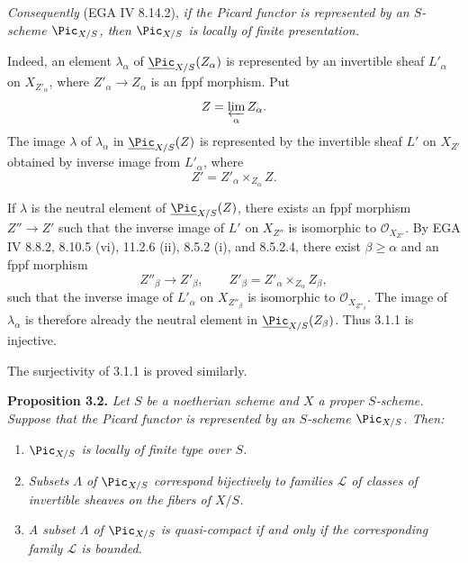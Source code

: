 \emph{Consequently} (EGA IV 8.14.2), \emph{if the Picard functor is
represented by an \(S\)-scheme \(\Pic_{X/S}\), then \(\Pic_{X/S}\) is
locally of finite presentation.}

Indeed, an element \(\lambda_\alpha\) of
\(\underline{\Pic}_{X/S}(Z_\alpha)\) is represented by an invertible sheaf
\(L'_\alpha\) on \(X_{Z'_\alpha}\), where
\(Z'_\alpha\to Z_\alpha\) is an fppf morphism. Put
\[
Z=\varprojlim_\alpha Z_\alpha.
\]
The image \(\lambda\) of \(\lambda_\alpha\) in
\(\underline{\Pic}_{X/S}(Z)\) is represented by the invertible sheaf
\(L'\) on \(X_{Z'}\) obtained by inverse image from \(L'_\alpha\), where
\[
Z'=Z'_\alpha\times_{Z_\alpha}Z.
\]

If \(\lambda\) is the neutral element of
\(\underline{\Pic}_{X/S}(Z)\), there exists an fppf morphism
\(Z''\to Z'\) such that the inverse image of \(L'\) on \(X_{Z''}\) is
isomorphic to \(\mathcal O_{X_{Z''}}\). By EGA IV 8.8.2, 8.10.5 (vi),
11.2.6 (ii), 8.5.2 (i), and 8.5.2.4, there exist
\(\beta\ge\alpha\) and an fppf morphism
\[
Z''_\beta\longrightarrow Z'_\beta,
\qquad
Z'_\beta=Z'_\alpha\times_{Z_\alpha}Z_\beta,
\]
such that the inverse image of \(L'_\alpha\) on \(X_{Z''_\beta}\) is
isomorphic to \(\mathcal O_{X_{Z''_\beta}}\). The image of
\(\lambda_\alpha\) is therefore already the neutral element in
\(\underline{\Pic}_{X/S}(Z_\beta)\). Thus 3.1.1 is injective.

The surjectivity of 3.1.1 is proved similarly.

\textbf{Proposition 3.2.} \emph{Let \(S\) be a noetherian scheme and
\(X\) a proper \(S\)-scheme. Suppose that the Picard functor is
represented by an \(S\)-scheme \(\Pic_{X/S}\). Then:}
\begin{enumerate}[label=(\roman*)]
\item \emph{\(\Pic_{X/S}\) is locally of finite type over \(S\).}
\item \emph{Subsets \(\Lambda\) of \(\Pic_{X/S}\) correspond bijectively
to families \(\mathscr L\) of classes of invertible sheaves on the fibers
of \(X/S\).}
\item \emph{A subset \(\Lambda\) of \(\Pic_{X/S}\) is quasi-compact if
and only if the corresponding family \(\mathscr L\) is bounded.}
\end{enumerate}

